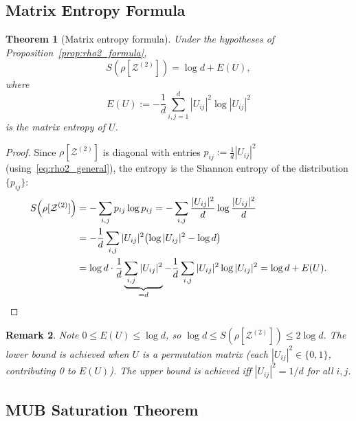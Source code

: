\documentclass[12pt,a4paper]{article}
\newtheorem{theorem}{Theorem}[section]
\newtheorem{remark}[theorem]{Remark}
\begin{document}
\subsection{Matrix Entropy Formula}

\begin{theorem}[Matrix entropy formula]\label{thm:matrix_entropy}
Under the hypotheses of Proposition~\ref{prop:rho2_formula},
\begin{equation}\label{eq:matrix_entropy}
  S\!\left(\rho[\mathcal{Z}^{(2)}]\right)
  = \log d + E(U),
\end{equation}
where
\begin{equation}\label{eq:EU}
  E(U) := -\frac{1}{d}\sum_{i,j=1}^d |U_{ij}|^2\log|U_{ij}|^2
\end{equation}
is the \emph{matrix entropy} of $U$.
\end{theorem}
\begin{proof}
Since $\rho[\mathcal{Z}^{(2)}]$ is diagonal with entries
$p_{ij}:=\frac{1}{d}|U_{ij}|^2$ (using~\eqref{eq:rho2_general}), the
entropy is the Shannon entropy of the distribution $\{p_{ij}\}$:
\begin{align*}
  S\!\left(\rho[\mathcal{Z}^{(2)}]\right)
  &= -\sum_{i,j}p_{ij}\log p_{ij}
   = -\sum_{i,j}\frac{|U_{ij}|^2}{d}\log\frac{|U_{ij}|^2}{d}\\
  &= -\frac{1}{d}\sum_{i,j}|U_{ij}|^2\bigl(\log|U_{ij}|^2-\log d\bigr)\\
  &= \log d\cdot\frac{1}{d}\underbrace{\sum_{i,j}|U_{ij}|^2}_{=d}
     -\frac{1}{d}\sum_{i,j}|U_{ij}|^2\log|U_{ij}|^2
   = \log d + E(U).\qedhere
\end{align*}
\end{proof}

\begin{remark}
Note $0\leq E(U)\leq\log d$, so $\log d\leq S(\rho[\mathcal{Z}^{(2)}])\leq
2\log d$.  The lower bound is achieved when $U$ is a permutation matrix
(each $|U_{ij}|^2\in\{0,1\}$, contributing 0 to $E(U)$).  The upper bound
is achieved iff $|U_{ij}|^2=1/d$ for all $i,j$.
\end{remark}

\subsection{MUB Saturation Theorem}
\end{document}
